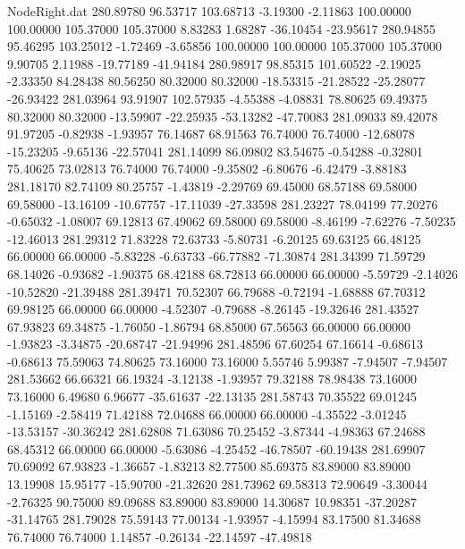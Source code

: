 \begin{filecontents}{NodeRight.dat}
 280.89780   96.53717  103.68713    -3.19300   -2.11863  100.00000  100.00000  105.37000  105.37000    8.83283    1.68287  -36.10454  -23.95617
 280.94855   95.46295  103.25012    -1.72469   -3.65856  100.00000  100.00000  105.37000  105.37000    9.90705    2.11988  -19.77189  -41.94184
 280.98917   98.85315  101.60522    -2.19025   -2.33350   84.28438   80.56250   80.32000   80.32000  -18.53315  -21.28522  -25.28077  -26.93422
 281.03964   93.91907  102.57935    -4.55388   -4.08831   78.80625   69.49375   80.32000   80.32000  -13.59907  -22.25935  -53.13282  -47.70083
 281.09033   89.42078   91.97205    -0.82938   -1.93957   76.14687   68.91563   76.74000   76.74000  -12.68078  -15.23205   -9.65136  -22.57041
 281.14099   86.09802   83.54675    -0.54288   -0.32801   75.40625   73.02813   76.74000   76.74000   -9.35802   -6.80676   -6.42479   -3.88183
 281.18170   82.74109   80.25757    -1.43819   -2.29769   69.45000   68.57188   69.58000   69.58000  -13.16109  -10.67757  -17.11039  -27.33598
 281.23227   78.04199   77.20276    -0.65032   -1.08007   69.12813   67.49062   69.58000   69.58000   -8.46199   -7.62276   -7.50235  -12.46013
 281.29312   71.83228   72.63733    -5.80731   -6.20125   69.63125   66.48125   66.00000   66.00000   -5.83228   -6.63733  -66.77882  -71.30874
 281.34399   71.59729   68.14026    -0.93682   -1.90375   68.42188   68.72813   66.00000   66.00000   -5.59729   -2.14026  -10.52820  -21.39488
 281.39471   70.52307   66.79688    -0.72194   -1.68888   67.70312   69.98125   66.00000   66.00000   -4.52307   -0.79688   -8.26145  -19.32646
 281.43527   67.93823   69.34875    -1.76050   -1.86794   68.85000   67.56563   66.00000   66.00000   -1.93823   -3.34875  -20.68747  -21.94996
 281.48596   67.60254   67.16614    -0.68613   -0.68613   75.59063   74.80625   73.16000   73.16000    5.55746    5.99387   -7.94507   -7.94507
 281.53662   66.66321   66.19324    -3.12138   -1.93957   79.32188   78.98438   73.16000   73.16000    6.49680    6.96677  -35.61637  -22.13135
 281.58743   70.35522   69.01245    -1.15169   -2.58419   71.42188   72.04688   66.00000   66.00000   -4.35522   -3.01245  -13.53157  -30.36242
 281.62808   71.63086   70.25452    -3.87344   -4.98363   67.24688   68.45312   66.00000   66.00000   -5.63086   -4.25452  -46.78507  -60.19438
 281.69907   70.69092   67.93823    -1.36657   -1.83213   82.77500   85.69375   83.89000   83.89000   13.19908   15.95177  -15.90700  -21.32620
 281.73962   69.58313   72.90649    -3.30044   -2.76325   90.75000   89.09688   83.89000   83.89000   14.30687   10.98351  -37.20287  -31.14765
 281.79028   75.59143   77.00134    -1.93957   -4.15994   83.17500   81.34688   76.74000   76.74000    1.14857   -0.26134  -22.14597  -47.49818

\end{filecontents}
